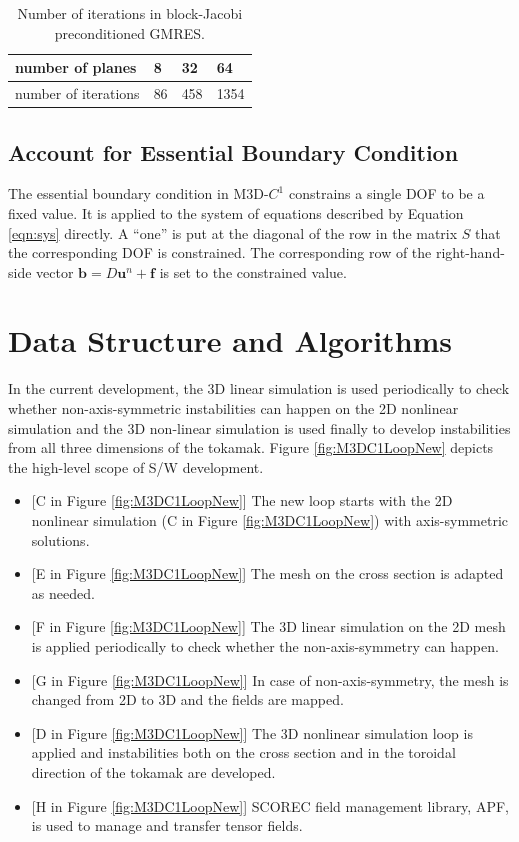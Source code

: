 \documentclass[11pt]{article}  %
\begin{document}
 \begin{table}
 \center
  \caption{Number of iterations in block-Jacobi preconditioned GMRES.}  \label{tab:iterNumPlane}
 \begin{tabular}{|l|l|l|l|}
   \hline
   number of planes &  8 &  32 &  64 \\ \hline
  number of iterations & 86 & 458 &  1354  \\ \hline
   \end{tabular}
\end{table}

\subsection{Account for Essential Boundary Condition} 
The essential boundary condition in M3D-$C^1$ constrains a single DOF to be a fixed value. It is applied to the system of equations described by Equation \ref{eqn:sys} directly.
A ``one''  is put at the diagonal of the row  in the matrix $S$ that the corresponding DOF is constrained. The corresponding row of the right-hand-side vector $\mathbf{b}=  D \mathbf{u}^n +\mathbf{f} $ is set to the constrained value. 
\section{Data Structure and Algorithms} \label{sec:impl}
In the current development,  the 3D linear simulation is used periodically to  check whether non-axis-symmetric instabilities can happen on the 2D nonlinear simulation and the 3D non-linear simulation is used finally to develop instabilities from all three dimensions of the tokamak. Figure \ref{fig:M3DC1LoopNew} depicts the high-level scope of S/W development. 
\begin{itemize} 
\item{[C in Figure \ref{fig:M3DC1LoopNew}]} The new loop starts with the 2D nonlinear simulation (C in Figure \ref{fig:M3DC1LoopNew}) with axis-symmetric solutions.
\item{[E in Figure \ref{fig:M3DC1LoopNew}]} The mesh on the cross section is adapted as needed. 
\item {[F in Figure \ref{fig:M3DC1LoopNew}]} The 3D linear simulation  on the 2D mesh is applied periodically to check whether the non-axis-symmetry can happen.  
\item{[G in Figure \ref{fig:M3DC1LoopNew}]} In case of non-axis-symmetry, the mesh is changed from 2D to 3D and the fields are mapped.
\item{[D in Figure \ref{fig:M3DC1LoopNew}]} The 3D nonlinear simulation loop is applied and instabilities both on the cross section and in the toroidal direction of the tokamak are developed.
\item{[H in Figure \ref{fig:M3DC1LoopNew}]} SCOREC field management library, APF, is used to manage and transfer tensor fields.
\end{itemize}
\end{document}
